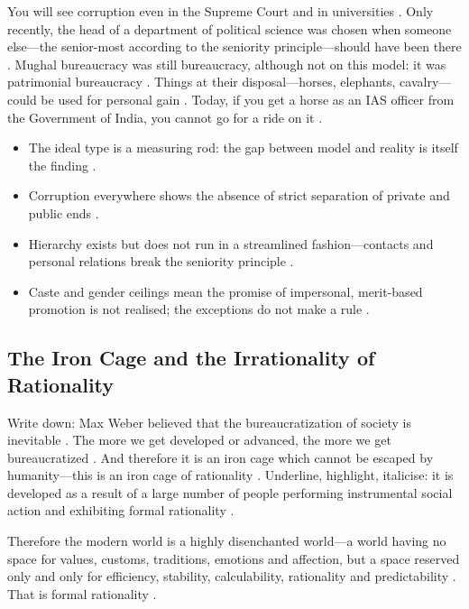 \begin{ExampleBox}
You will see corruption even in the Supreme Court and in universities . Only recently, the head of a department of political science was chosen when someone else---the senior-most according to the seniority principle---should have been there .
Mughal bureaucracy was still bureaucracy, although not on this model: it was patrimonial bureaucracy . Things at their disposal---horses, elephants, cavalry---could be used for personal gain . Today, if you get a horse as an IAS officer from the Government of India, you cannot go for a ride on it .
\end{ExampleBox}

\begin{QuickRevision}
\begin{itemize}
    \item The ideal type is a measuring rod: the gap between model and reality is itself the finding .
    \item Corruption everywhere shows the absence of strict separation of private and public ends .
    \item Hierarchy exists but does not run in a streamlined fashion---contacts and personal relations break the seniority principle .
    \item Caste and gender ceilings mean the promise of impersonal, merit-based promotion is not realised; the exceptions do not make a rule .
\end{itemize}
\end{QuickRevision}

\subsection{The Iron Cage and the Irrationality of Rationality}

\begin{KeyConcept}
Write down: Max Weber believed that the bureaucratization of society is inevitable . The more we get developed or advanced, the more we get bureaucratized .
And therefore it is an iron cage which cannot be escaped by humanity---this is an iron cage of rationality .
Underline, highlight, italicise: it is developed as a result of a large number of people performing instrumental social action and exhibiting formal rationality .
\end{KeyConcept}

Therefore the modern world is a highly disenchanted world---a world having no space for values, customs, traditions, emotions and affection, but a space reserved only and only for efficiency, stability, calculability, rationality and predictability . That is formal rationality .

